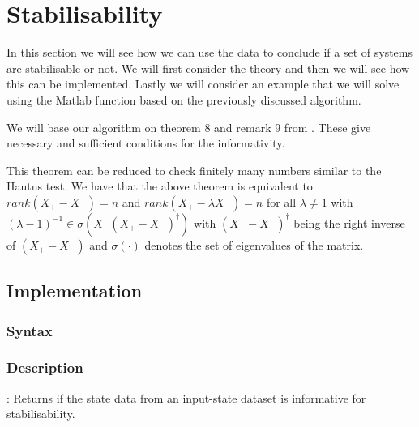 \section{Stabilisability}
In this section we will see how we can use the data to conclude if a set of systems are stabilisable or not. We will first consider the theory and then we will see how this can be implemented. Lastly we will consider an example that we will solve using the Matlab function based on the previously discussed algorithm.


We will base our algorithm on theorem 8 and remark 9 from \cite{waarde2019data}. These give necessary and sufficient conditions for the informativity.


This theorem can be reduced to check finitely many numbers similar to the Hautus test. We have that the above theorem is equivalent to $rank(X_+ - X_-) = n$ and $rank(X_+ - \lambda X_-) = n$ for all $\lambda \neq 1$ with $(\lambda - 1)^{-1} \in \sigma(X_- (X_+ - X_-)^\dagger)$ with $(X_+ - X_-)^\dagger$ being the right inverse of $(X_+ - X_-)$ and $\sigma(\cdot)$ denotes the set of eigenvalues of the matrix.




\subsection{Implementation}
\subsubsection*{Syntax}

\subsubsection*{Description}
: Returns if the state data from an input-state dataset is informative for stabilisability.%

